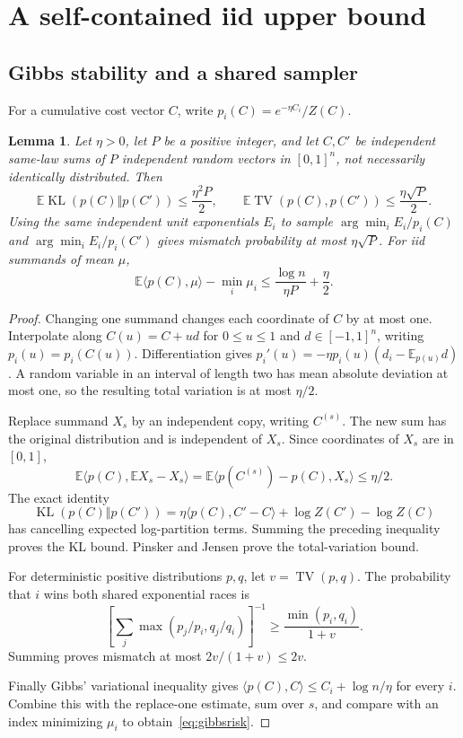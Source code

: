 \documentclass[11pt]{article}
\newtheorem{lemma}[theorem]{Lemma}
\newcommand{\E}{\mathbb E}
\newcommand{\1}{\mathbf 1}
\newcommand{\TV}{\operatorname{TV}}
\newcommand{\KL}{\operatorname{KL}}
\begin{document}
\section{A self-contained iid upper bound}

\subsection{Gibbs stability and a shared sampler}

For a cumulative cost vector $C$, write
$p_i(C)=e^{-\eta C_i}/Z(C)$.

\begin{lemma}\label{lem:gibbs}
Let $\eta>0$, let $P$ be a positive integer, and let $C,C'$ be
independent same-law sums of $P$ independent random vectors in $[0,1]^n$, not necessarily identically distributed.
Then
\[
 \E\KL(p(C)\Vert p(C'))\le\frac{\eta^2P}{2},
 \qquad
 \E\TV(p(C),p(C'))\le\frac{\eta\sqrt P}{2}.
\]
Using the same independent unit exponentials $E_i$ to sample
$\arg\min_i E_i/p_i(C)$ and $\arg\min_i E_i/p_i(C')$
gives mismatch probability at most $\eta\sqrt P$.
For iid summands of mean $\mu$,
\begin{equation}\label{eq:gibbsrisk}
 \E\langle p(C),\mu\rangle-\min_i\mu_i
 \le\frac{\log n}{\eta P}+\frac{\eta}{2}.
\end{equation}
\end{lemma}

\begin{proof}
Changing one summand changes each coordinate of $C$ by at most one.
Interpolate along $C(u)=C+ud$ for $0\le u\le1$ and
$d\in[-1,1]^n$, writing $p_i(u)=p_i(C(u))$. Differentiation gives
$p_i'(u)=-\eta p_i(u)(d_i-\E_{p(u)}d)$.
A random variable in an interval of length two has mean absolute
deviation at most one, so the resulting total variation is at most
$\eta/2$.

Replace summand $X_s$ by an independent copy, writing $C^{(s)}$.
The new sum has the original distribution and is independent of $X_s$.
Since coordinates of $X_s$ are in $[0,1]$,
\[
 \E\langle p(C),\E X_s-X_s\rangle
 =\E\langle p(C^{(s)})-p(C),X_s\rangle
 \le\eta/2 .
\]
The exact identity
\[
 \KL(p(C)\Vert p(C'))=
 \eta\langle p(C),C'-C\rangle+\log Z(C')-\log Z(C)
\]
has cancelling expected log-partition terms. Summing the preceding
inequality proves the KL bound. Pinsker and Jensen prove the
total-variation bound.

For deterministic positive distributions $p,q$, let $v=\TV(p,q)$.
The probability that $i$ wins both shared exponential races is
\[
 \left[\sum_j\max(p_j/p_i,q_j/q_i)\right]^{-1}
 \ge\frac{\min(p_i,q_i)}{1+v}.
\]
Summing proves mismatch at most $2v/(1+v)\le2v$.

Finally Gibbs' variational inequality gives
$\langle p(C),C\rangle\le C_i+\log n/\eta$ for every $i$.
Combine this with the replace-one estimate, sum over $s$, and compare
with an index minimizing $\mu_i$ to obtain~\eqref{eq:gibbsrisk}.
\end{proof}
\end{document}
